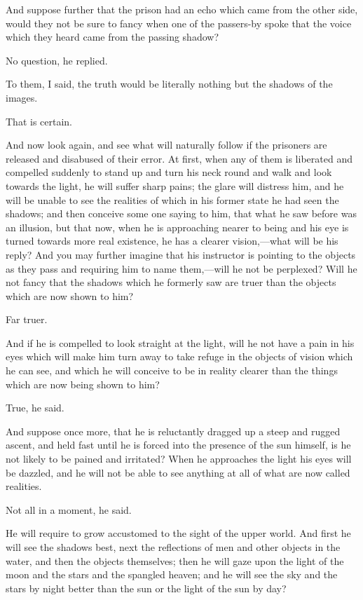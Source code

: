 And suppose further that the prison had an echo which came from the
other side, would they not be sure to fancy when one of the passers-by
spoke that the voice which they heard came from the passing shadow?

No question, he replied.

To them, I said, the truth would be literally nothing but the shadows
of the images.

That is certain.

And now look again, and see what will naturally follow if the
prisoners are released and disabused of their error. At first, when
any of them is liberated and compelled suddenly to stand up and turn
his neck round and walk and look towards the light, he will suffer
sharp pains; the glare will distress him, and he will be unable to see
the realities of which in his former state he had seen the shadows;
and then conceive some one saying to him, that what he saw before was
an illusion, but that now, when he is approaching nearer to being and
his eye is turned towards more real existence, he has a clearer
vi\-sion,---what will be his reply? And you may further imagine that
his instructor is pointing to the objects as they pass and requiring
him to name them,---will he not be perplexed? Will he not fancy that
the shadows which he formerly saw are truer than the objects which are
now shown to him?

Far truer.

And if he is compelled to look straight at the light, will he not have
a pain in his eyes which will make him turn away to take refuge in the
objects of vision which he can see, and which he will conceive to be
in reality clearer than the things which are now being shown to him?

True, he said.

And suppose once more, that he is reluctantly dragged up a steep and
rugged ascent, and held fast until he is forced into the presence of
the sun himself, is he not likely to be pained and irritated? When he
approaches the light his eyes will be dazzled, and he will not be able
to see anything at all of what are now called realities.

Not all in a moment, he said.

He will require to grow accustomed to the sight of the upper world.
And first he will see the shadows best, next the reflections of men
and other objects in the water, and then the objects themselves; then
he will gaze upon the light of the moon and the stars and the spangled
heaven; and he will see the sky and the stars by night better than the
sun or the light of the sun by day?

